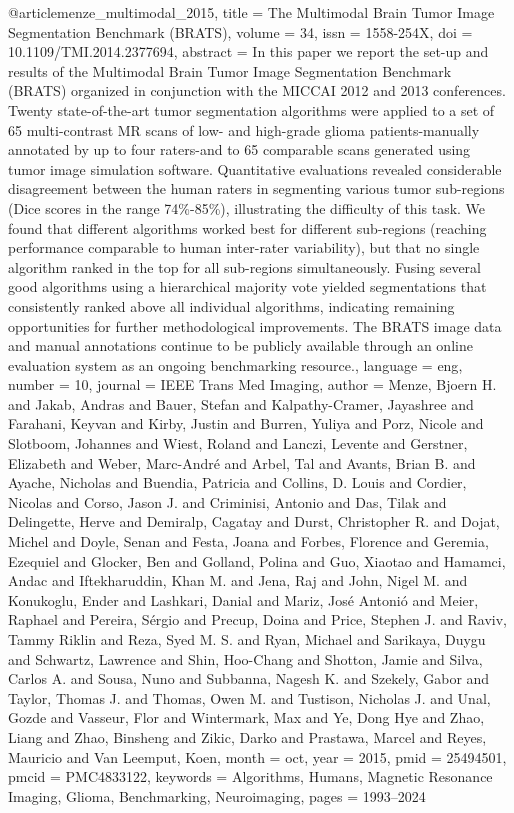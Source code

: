 \documentclass{article}
\begin{document}
@article{menze_multimodal_2015,
	title = {The {Multimodal} {Brain} {Tumor} {Image} {Segmentation} {Benchmark} ({BRATS})},
	volume = {34},
	issn = {1558-254X},
	doi = {10.1109/TMI.2014.2377694},
	abstract = {In this paper we report the set-up and results of the Multimodal Brain Tumor Image Segmentation Benchmark (BRATS) organized in conjunction with the MICCAI 2012 and 2013 conferences. Twenty state-of-the-art tumor segmentation algorithms were applied to a set of 65 multi-contrast MR scans of low- and high-grade glioma patients-manually annotated by up to four raters-and to 65 comparable scans generated using tumor image simulation software. Quantitative evaluations revealed considerable disagreement between the human raters in segmenting various tumor sub-regions (Dice scores in the range 74\%-85\%), illustrating the difficulty of this task. We found that different algorithms worked best for different sub-regions (reaching performance comparable to human inter-rater variability), but that no single algorithm ranked in the top for all sub-regions simultaneously. Fusing several good algorithms using a hierarchical majority vote yielded segmentations that consistently ranked above all individual algorithms, indicating remaining opportunities for further methodological improvements. The BRATS image data and manual annotations continue to be publicly available through an online evaluation system as an ongoing benchmarking resource.},
	language = {eng},
	number = {10},
	journal = {IEEE Trans Med Imaging},
	author = {Menze, Bjoern H. and Jakab, Andras and Bauer, Stefan and Kalpathy-Cramer, Jayashree and Farahani, Keyvan and Kirby, Justin and Burren, Yuliya and Porz, Nicole and Slotboom, Johannes and Wiest, Roland and Lanczi, Levente and Gerstner, Elizabeth and Weber, Marc-André and Arbel, Tal and Avants, Brian B. and Ayache, Nicholas and Buendia, Patricia and Collins, D. Louis and Cordier, Nicolas and Corso, Jason J. and Criminisi, Antonio and Das, Tilak and Delingette, Herve and Demiralp, Cagatay and Durst, Christopher R. and Dojat, Michel and Doyle, Senan and Festa, Joana and Forbes, Florence and Geremia, Ezequiel and Glocker, Ben and Golland, Polina and Guo, Xiaotao and Hamamci, Andac and Iftekharuddin, Khan M. and Jena, Raj and John, Nigel M. and Konukoglu, Ender and Lashkari, Danial and Mariz, José Antonió and Meier, Raphael and Pereira, Sérgio and Precup, Doina and Price, Stephen J. and Raviv, Tammy Riklin and Reza, Syed M. S. and Ryan, Michael and Sarikaya, Duygu and Schwartz, Lawrence and Shin, Hoo-Chang and Shotton, Jamie and Silva, Carlos A. and Sousa, Nuno and Subbanna, Nagesh K. and Szekely, Gabor and Taylor, Thomas J. and Thomas, Owen M. and Tustison, Nicholas J. and Unal, Gozde and Vasseur, Flor and Wintermark, Max and Ye, Dong Hye and Zhao, Liang and Zhao, Binsheng and Zikic, Darko and Prastawa, Marcel and Reyes, Mauricio and Van Leemput, Koen},
	month = oct,
	year = {2015},
	pmid = {25494501},
	pmcid = {PMC4833122},
	keywords = {Algorithms, Humans, Magnetic Resonance Imaging, Glioma, Benchmarking, Neuroimaging},
	pages = {1993--2024}
}
\end{document}
